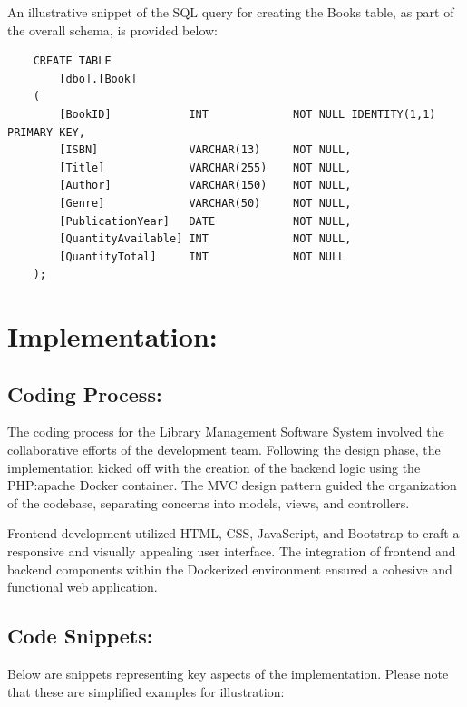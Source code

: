 \documentclass[12pt,titlepage,a4paper]{report}
\begin{document}
An illustrative snippet of the SQL query for creating the Books table, as part of the overall schema, is provided below:
\begin{verbatim}
    CREATE TABLE
        [dbo].[Book]
    (
        [BookID]            INT             NOT NULL IDENTITY(1,1) PRIMARY KEY,
        [ISBN]              VARCHAR(13)     NOT NULL,
        [Title]             VARCHAR(255)    NOT NULL,
        [Author]            VARCHAR(150)    NOT NULL,
        [Genre]             VARCHAR(50)     NOT NULL,
        [PublicationYear]   DATE            NOT NULL,
        [QuantityAvailable] INT             NOT NULL,
        [QuantityTotal]     INT             NOT NULL
    );
\end{verbatim}

\chapter{Implementation:}

\section{Coding Process:}
The coding process for the Library Management Software System involved the collaborative efforts of the development team. Following the design phase, the implementation kicked off with the creation of the backend logic using the PHP:apache Docker container. The MVC design pattern guided the organization of the codebase, separating concerns into models, views, and controllers.

Frontend development utilized HTML, CSS, JavaScript, and Bootstrap to craft a responsive and visually appealing user interface. The integration of frontend and backend components within the Dockerized environment ensured a cohesive and functional web application.

\section{Code Snippets:}
Below are snippets representing key aspects of the implementation. Please note that these are simplified examples for illustration:
\end{document}
